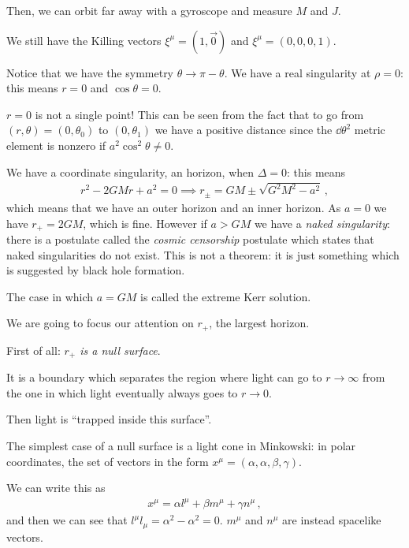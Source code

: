 \documentclass[main.tex]{subfiles}
\begin{document}
Then, we can orbit far away with a gyroscope and measure \(M\) and \(J\). 

We still have the Killing vectors \(\xi^{\mu } = (1, \vec{0})\) and \(\xi^{\mu }= (0,0,0,1)\). 

Notice that we have the symmetry \(\theta \rightarrow \pi - \theta \). We have a real singularity at \(\rho =0\): this means \(r =0 \) and \(\cos \theta =0\). 

\(r=0\) is not a single point! This can be seen from the fact that to go from \((r, \theta ) = (0, \theta_0 )\) to \((0, \theta_1 )\) we have a positive distance since the \(\dd{\theta^2} \) metric element is nonzero if \(a^2 \cos^2\theta \neq 0\). 

We have a coordinate singularity, an horizon, when \(\Delta = 0\): this means 
%
\begin{align}
  r^2 - 2GMr + a^2 = 0 \implies r_{\pm} =GM \pm \sqrt{G^2M^2-a^2}
\,,
\end{align}
%
which means that we have an outer horizon and an inner horizon. As \(a=0\) we have \(r_+ = 2GM\), which is fine.
However if \(a> GM\) we have a \emph{naked singularity}: there is a postulate called the \emph{cosmic censorship} postulate which states that naked singularities do not exist. 
This is not a theorem: it is just something which is suggested by black hole formation. 

The case in which \(a = GM\) is called the extreme Kerr solution. 

We are going to focus our attention on \(r_{+}\), the largest horizon. 

First of all: \emph{$r_{+}$ is a null surface}. 

It is a boundary which separates the region where light can go to \(r \rightarrow \infty \) from the one in which light eventually always goes to \(r \rightarrow 0\). 

Then light is ``trapped inside this surface''.

The simplest case of a null surface  is a light cone in Minkowski: in polar coordinates, the set of vectors in the form \(x^{\mu } = (\alpha , \alpha , \beta , \gamma )\).

We can write this as 
%
\begin{align}
  x^{\mu } = \alpha l^{\mu } + \beta m^{\mu } + \gamma n^{\mu }
\,,
\end{align}
%
and then we can see that \(l^{\mu } l_{\mu } = \alpha^2 - \alpha^2 = 0\). \(m^{\mu } \) and \(n^{\mu }\) are instead spacelike vectors. 
\end{document}
